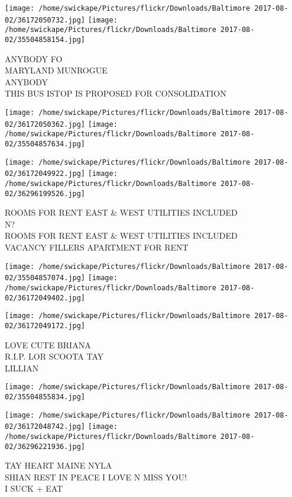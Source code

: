 \documentclass[10pt,letterpaper]{article}
\begin{document}
\texttt{[image: /home/swickape/Pictures/flickr/Downloads/Baltimore 2017-08-02/36172050732.jpg]}
\texttt{[image: /home/swickape/Pictures/flickr/Downloads/Baltimore 2017-08-02/35504858154.jpg]}

ANYBODY FO\\
MARYLAND MUNROGUE\\
ANYBODY\\
THIS BUS ISTOP IS PROPOSED FOR CONSOLIDATION
\pagebreak

\texttt{[image: /home/swickape/Pictures/flickr/Downloads/Baltimore 2017-08-02/36172050362.jpg]}
\texttt{[image: /home/swickape/Pictures/flickr/Downloads/Baltimore 2017-08-02/35504857634.jpg]}

\texttt{[image: /home/swickape/Pictures/flickr/Downloads/Baltimore 2017-08-02/36172049922.jpg]}
\texttt{[image: /home/swickape/Pictures/flickr/Downloads/Baltimore 2017-08-02/36296199526.jpg]}

ROOMS FOR RENT EAST \& WEST UTILITIES INCLUDED\\
N?\\
ROOMS FOR RENT EAST \& WEST UTILITIES INCLUDED\\
VACANCY FILLERS APARTMENT FOR RENT
\pagebreak

\texttt{[image: /home/swickape/Pictures/flickr/Downloads/Baltimore 2017-08-02/35504857074.jpg]}
\texttt{[image: /home/swickape/Pictures/flickr/Downloads/Baltimore 2017-08-02/36172049402.jpg]}

\vspace{0.25in}
\texttt{[image: /home/swickape/Pictures/flickr/Downloads/Baltimore 2017-08-02/36172049172.jpg]}

LOVE CUTE BRIANA\\
R.I.P. LOR SCOOTA TAY\\
LILLIAN
\pagebreak

\texttt{[image: /home/swickape/Pictures/flickr/Downloads/Baltimore 2017-08-02/35504855834.jpg]}

\vspace{0.25in}
\texttt{[image: /home/swickape/Pictures/flickr/Downloads/Baltimore 2017-08-02/36172048742.jpg]}
\texttt{[image: /home/swickape/Pictures/flickr/Downloads/Baltimore 2017-08-02/36296221936.jpg]}

TAY HEART MAINE NYLA\\
SHIAN REST IN PEACE I LOVE N MISS YOU!\\
I SUCK + EAT
\pagebreak
\end{document}
